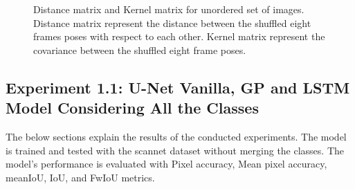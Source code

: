 	\begin{figure}
		\centering
		\qquad
		\caption{Distance matrix and Kernel matrix for unordered set of images. Distance matrix represent the distance between the shuffled eight frames poses with respect to each other. Kernel matrix represent the covariance between the shuffled eight frame poses.}%
		\label{fig:unordered_D_and_K}%
	\end{figure}
	

    \subsection{Experiment 1.1: U-Net Vanilla, GP and LSTM Model Considering All the Classes}
    
    The below sections explain the results of the conducted experiments. The model is trained and tested with the scannet dataset without merging the classes. The model's performance is evaluated with Pixel accuracy, Mean pixel accuracy, meanIoU, IoU, and FwIoU metrics.

